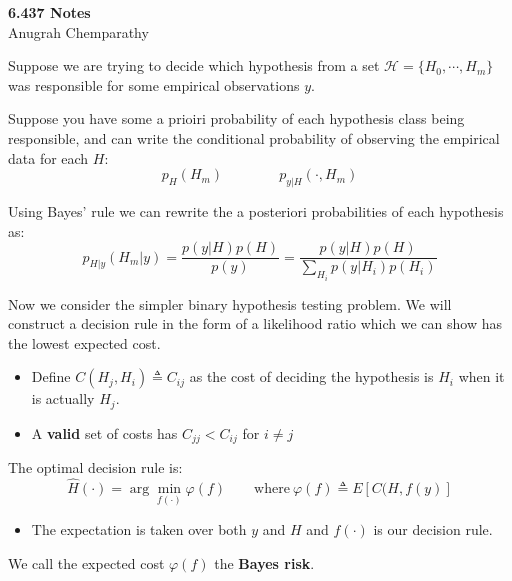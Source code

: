 \documentclass[12pt]{article} %
\begin{document}
\setlength{\abovedisplayskip}{7pt}

\begin{center}
    \textbf{6.437 Notes}\\
    Anugrah Chemparathy
\end{center}

Suppose we are trying to decide which hypothesis from a set $\mathcal{H} = \{H_0,\cdots,H_m\}$ was responsible for some empirical observations $y$.

\separate

Suppose you have some a prioiri probability of each hypothesis class being responsible, and can write the conditional probability of observing the empirical data for each $H$:
\begin{equation*}
    p_H(H_m) \qquad \qquad p_{y|H} (\cdot, H_m)
\end{equation*}

Using Bayes' rule we can rewrite the a posteriori probabilities of each hypothesis as:
\begin{equation*}
    p_{H|y} (H_m|y) = \frac{p(y|H) p(H)}{p(y)} = \frac{p(y|H) p(H)}{\sum_{H_i} p(y|H_i) p(H_i)}
\end{equation*}

\separate

Now we consider the simpler binary hypothesis testing problem. We will construct a decision rule in the form of a likelihood ratio which we can show has the lowest expected cost.
\begin{itemize}[topsep=-1pt, itemsep=-1pt]
    \item Define $C(H_j,H_i) \triangleq C_{ij}$ as the cost of deciding the hypothesis is $H_i$ when it is actually $H_j$.
    \item A \textbf{valid} set of costs has $C_{jj} < C_{ij}$ for $i \neq j$
\end{itemize}

The optimal decision rule is:
\begin{equation*}
    \hat{H}(\cdot) = \arg \min_{f(\cdot)} \varphi(f) 
    \qquad
    \text{where}
    \
    \varphi(f) \triangleq E[C(H,f(y)]
\end{equation*}
\begin{itemize}[topsep=-1pt]
    \item The expectation is taken over both $y$ and $H$ and $f(\cdot)$ is our decision rule.
\end{itemize}
We call the expected cost $\varphi(f)$ the \textbf{Bayes risk}.
\end{document}
